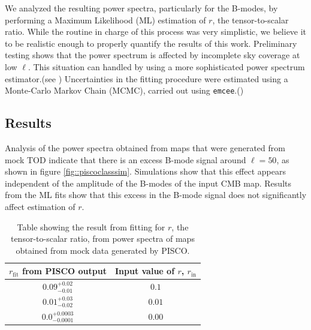 \documentclass[a4paper,fleqn]{cas-dc}\sloppy
\begin{document}
	We analyzed the resulting power spectra, particularly for the B-modes, by performing a Maximum Likelihood (ML) estimation of $r$, the tensor-to-scalar ratio. While the routine in charge of this process was very simplistic, we believe it to be realistic enough to properly quantify the results of this work. Preliminary testing shows that the power spectrum is affected by incomplete sky coverage at low $\ell$. This situation can handled by using a more sophisticated power spectrum estimator.(see \cite{2015ApJ...814..103W} ) Uncertainties in the fitting procedure were estimated using a Monte-Carlo Markov Chain (MCMC), carried out using \texttt{emcee}.(\cite{emcee})
	
	\subsection{Results}
	
	Analysis of the power spectra obtained from maps that were generated from mock TOD indicate that there is an excess B-mode signal around $\ell=50$, as shown in figure \ref{fig::piscoclasssim}. Simulations show that this effect appears independent of the amplitude of the B-modes of the input CMB map. Results from the ML fits show that this excess in the B-mode signal does not significantly affect estimation of $r$.
	
	\begin{table}[width=1\linewidth,cols=2,pos=h]
		\caption{Table showing the result from fitting for $r$, the tensor-to-scalar ratio, from power spectra of maps obtained from mock data generated by PISCO. }
		\label{table::pisco_fits}
		\begin{tabular*}{\tblwidth}{@{} CC@{} }
			\toprule
			$r_\mathrm{fit}$ from PISCO output & Input value of $r$, $r_{\mathrm{in}}$ \\
			\midrule
			$0.09^{+0.02}_{-0.01}$ & $0.1$ \\
			$0.01^{+0.03}_{-0.02}$ & $0.01$ \\
			$0.0^{+0.0003}_{-0.0001}$ & $0.00$ \\ 
			\bottomrule
		\end{tabular*}
	\end{table}
	
\end{document}
